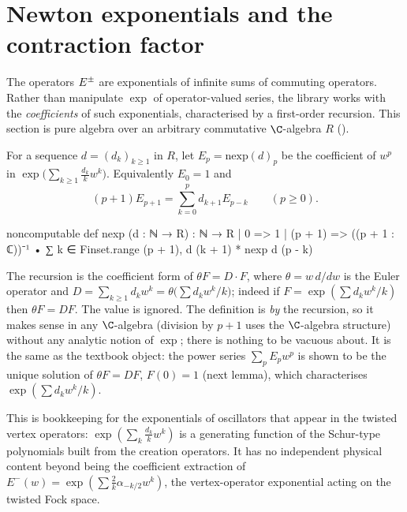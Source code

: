 \section{Newton exponentials and the contraction factor}\label{ch08:sec:newton}

The operators $E^{\pm}$ are exponentials of infinite sums of commuting operators.  Rather
than manipulate $\exp$ of operator-valued series, the library works with the
\emph{coefficients} of such exponentials, characterised by a first-order recursion.  This section
is pure algebra over an arbitrary commutative $\C$-algebra $R$
().

\begin{definition}\label{ch08:def:nexp}
For a sequence $d=(d_k)_{k\ge1}$ in $R$, let $E_p=\mathrm{nexp}(d)_p$ be the coefficient of $w^p$
in $\exp\bigl(\sum_{k\ge1}\frac{d_k}{k}w^k\bigr)$.  Equivalently $E_0=1$ and
\begin{equation*}
  (p+1)E_{p+1}=\sum_{k=0}^{p}d_{k+1}E_{p-k}\qquad(p\ge0).
\end{equation*}
\end{definition}
\begin{leancode}
noncomputable def nexp (d : ℕ → R) : ℕ → R
  | 0 => 1
  | (p + 1) => ((p + 1 : ℂ))⁻¹ • ∑ k ∈ Finset.range (p + 1), d (k + 1) * nexp d (p - k)
\end{leancode}
\begin{dictionary}
The recursion is the coefficient form of $\theta F=D\cdot F$, where $\theta=w\,d/dw$ is the Euler
operator and $D=\sum_{k\ge1}d_kw^k=\theta\bigl(\sum d_kw^k/k\bigr)$; indeed if
$F=\exp(\sum d_kw^k/k)$ then $\theta F=DF$.  The value  is ignored.  The definition is
\emph{by} the recursion, so it makes sense in any $\C$-algebra (division by $p+1$ uses the
$\C$-algebra structure) without any analytic notion of $\exp$; there is nothing to be vacuous
about.  It is the same as the textbook object: the power series $\sum_pE_pw^p$ is shown to be the
unique solution of $\theta F=DF$, $F(0)=1$ (next lemma), which characterises
$\exp(\sum d_kw^k/k)$.
\end{dictionary}

\begin{physics}
This is bookkeeping for the exponentials of oscillators that appear in the twisted vertex operators: $\exp(\sum_k \frac{d_k}{k}w^k)$ is a generating function of the Schur-type polynomials built from the creation operators. It has no independent physical content beyond being the coefficient extraction of $E^-(w)=\exp(\sum \frac{2}{k} \alpha_{-k/2}w^k)$, the vertex-operator exponential acting on the twisted Fock space.
\end{physics}

